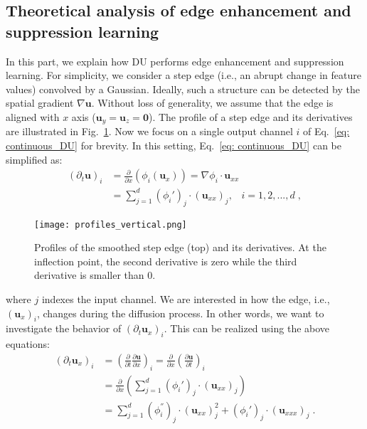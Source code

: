 \documentclass[a4paper,fleqn]{cas-dc}
\begin{document}
\subsection{Theoretical analysis of edge enhancement and suppression learning}
\label{sec: theoretical_analysis}
In this part, we explain how DU performs edge enhancement and suppression learning.
For simplicity, we consider a step edge (i.e., an abrupt change in feature values) convolved by a Gaussian. Ideally, such a structure can be detected by the spatial gradient $\nabla \mathbf{u}$. Without loss of generality, we assume that the edge is aligned with $x$ axis ($\mathbf{u}_y=\textbf{u}_z=\textbf{0}$). The profile of a step edge and its derivatives are illustrated in Fig.~\ref{fig: edge_profile}. Now we focus on a single output channel $i$ of Eq.~\eqref{eq: continuous_DU} for brevity. In this setting, Eq.~\eqref{eq: continuous_DU} can be simplified as:
\begin{align}
    (\partial_t \textbf{u})_i
        &=
        \frac{\partial}{\partial x}\left(
            \phi_i\left(\textbf{u}_x\right)
            \right)
            =
            \nabla\phi_i \cdot \textbf{u}_{xx}\\
        &= \sum_{j=1}^{d} (\phi_i')_j \cdot(\textbf{u}_{xx})_j, \;\;\; i=1,2,...,d \;,
\end{align}
\begin{figure}[t]
    \centering
    \texttt{[image: profiles\_vertical.png]}
    \caption{Profiles of the smoothed step edge (top) and its derivatives. At the inflection point, the second derivative is zero while the third derivative is smaller than 0.
}
    \label{fig: edge_profile}
\end{figure}
where $j$ indexes the input channel. We are interested in how the edge, i.e., $(\textbf{u}_x)_i$, changes during the diffusion process. In other words, we want to investigate the behavior of $(\partial_t \textbf{u}_x)_i$. This can be realized using the above equations: 
\begin{align}
        (\partial_t \textbf{u}_x)_i
        &= \left(
                \frac{\partial}{\partial t}\frac{\partial \textbf{u}}{\partial x}
            \right)_i
        =\frac{\partial}{\partial x}
                    \left(\frac{\partial \textbf{u}}{\partial t}\right)_i
                    \\
        &= \frac{\partial}{\partial x}\left(
            \sum_{j=1}^{d}\left(\phi_i'\right)_j
            \cdot \left(\textbf{u}_{xx}\right)_j
        \right) \\
        &= \sum_{j=1}^{d} (\phi_i^{''})_j \cdot (\textbf{u}_{xx})_j^2 + (\phi_i')_j \cdot (\textbf{u}_{xxx})_j \; .
        \label{eq: contribution}
\end{align}
\end{document}
